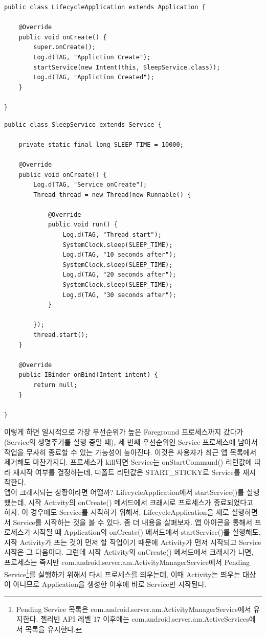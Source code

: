 \begin{lstlisting}[frame=single]
public class LifecycleApplication extends Application {
		
	@Override
	public void onCreate() {
		super.onCreate();
		Log.d(TAG, "Appliction Create");
		startService(new Intent(this, SleepService.class));
		Log.d(TAG, "Appliction Created");
	}

}
\end{lstlisting}

\begin{lstlisting}[frame=single, caption=SleepService, label=SleepService]
public class SleepService extends Service {

	private static final long SLEEP_TIME = 10000;
	
	@Override
	public void onCreate() {
		Log.d(TAG, "Service onCreate");
		Thread thread = new Thread(new Runnable() {

			@Override
			public void run() {
				Log.d(TAG, "Thread start");
				SystemClock.sleep(SLEEP_TIME);
				Log.d(TAG, "10 seconds after");
				SystemClock.sleep(SLEEP_TIME);
				Log.d(TAG, "20 seconds after");
				SystemClock.sleep(SLEEP_TIME);
				Log.d(TAG, "30 seconds after");
			}
			
		});
		thread.start();
	}
	
	@Override
	public IBinder onBind(Intent intent) {
		return null;
	}

}
\end{lstlisting}
이렇게 하면 일시적으로 가장 우선순위가 높은 Foreground 프로세스까지 갔다가(Service의 생명주기를 실행 중일 때), 세 번째 우선순위인 Service 프로세스에 남아서 작업을 무사히 종료할 수 있는 가능성이 높아진다.
이것은 사용자가 최근 앱 목록에서 제거해도 마찬가지다. 
프로세스가 kill되면 Service는 onStartCommand() 리턴값에 따라 재시작 여부를 결정하는데, 디폴트 리턴값은 START\_STICKY로 Service를 재시작한다.\\

앱이 크래시되는 상황이라면 어떨까? LifecycleApplication에서 startService()를 실행했는데, 시작 Activity의 onCreate() 메서드에서 크래시로 프로세스가 종료되었다고 하자. 
이 경우에도 Service를 시작하기 위해서, LifecycleApplication을 새로 실행하면서 Service를 시작하는 것을 볼 수 있다.
좀 더 내용을 살펴보자. 앱 아이콘을 통해서 프로세스가 시작될 때 Application의 onCreate() 메서드에서 startService()를 실행해도, 시작 Activity가 뜨는 것이 먼저 할 작업이기 때문에 Activity가 먼저 시작되고 Service 시작은 그 다음이다.
그런데 시작 Activity의 onCreate() 메서드에서 크래시가 나면, 프로세스는 죽지만 com.android.server.am.ActivityManagerService에서 Pending Service\footnote{Pending Service 목록은 com.android.server.am.ActivityManagerService에서 유지한다. 젤리빈 API 레벨 17 이후에는 com.android.server.am.ActiveServices에서 목록을 유지한다.}를 실행하기 위해서 다시 프로세스를 띄우는데, 이때 Activity는 띄우는 대상이 아니므로 Application을 생성한 이후에 바로 Service만 시작된다.\\


